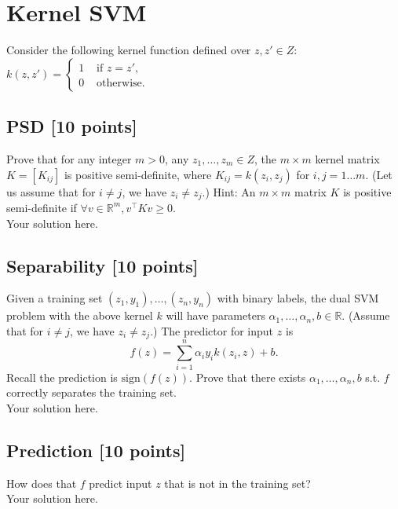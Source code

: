 \documentclass[a4paper]{article}
\theoremstyle{definition}
\newcommand{\R}{\mathbb R}
\newcommand{\sgn}{\mathrm{sign}}
\begin{document}
\section{Kernel SVM}
Consider the following kernel function defined over $z,z'\in Z$: $k(z,z') =
\begin{cases}
1 & \text{~if~} z=z', \\
0 & \text{~otherwise.}
\end{cases}$

\subsection{PSD [10 points]}

	Prove that for any integer $m>0$, any $z_1, \ldots, z_m \in Z$, the $m \times m$ kernel matrix $K=[K_{ij}]$ is positive semi-definite, where $K_{ij}=k(z_i, z_j)$ for $i,j=1\ldots m$. (Let us assume that for $i \neq j$, we have $z_i \neq z_j$.)
	Hint: An $m\times m$ matrix $K$ is positive semi-definite if $\forall v \in \R^m, v^\top K v \ge 0$. \\
	{\color{blue}
		Your solution here.
}
	
\subsection{Separability [10 points]}
	
	Given a training set $(z_1, y_1), \ldots, (z_n, y_n)$ with binary labels, the dual SVM problem with the above kernel $k$ will have parameters $\alpha_1, \ldots, \alpha_n, b \in \R$.  (Assume that for $i \neq j$, we have $z_i \neq z_j$.) The predictor for input $z$ is
	$$f(z) = \sum_{i=1}^n \alpha_i y_i k(z_i, z) + b.$$
	Recall the prediction is $\sgn(f(z))$.
	Prove that there exists $\alpha_1, \ldots, \alpha_n, b$ s.t. $f$ correctly separates the training set.\\
	{\color{blue}
		Your solution here.
}
	
\subsection{Prediction [10 points]}
	
	How does that $f$ predict input $z$ that is not in the training set? \\
	{\color{blue}
		Your solution here.
}
\end{document}
